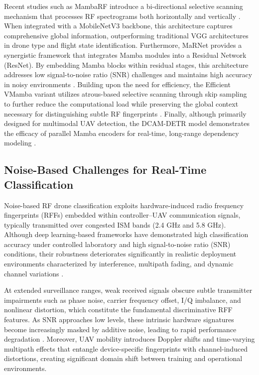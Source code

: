 \documentclass[runningheads]{llncs}
\begin{document}
Recent studies such as MambaRF introduce a bi-directional selective scanning mechanism that processes RF spectrograms both horizontally and vertically \cite{yao2025mambarf}. When integrated with a MobileNetV3 backbone, this architecture captures comprehensive global information, outperforming traditional VGG architectures in drone type and flight state identification. Furthermore, MaRNet provides a synergistic framework that integrates Mamba modules into a Residual Network (ResNet). By embedding Mamba blocks within residual stages, this architecture addresses low signal-to-noise ratio (SNR) challenges and maintains high accuracy in noisy environments \cite{mi2026marnet}. Building upon the need for efficiency, the Efficient VMamba variant utilizes atrous-based selective scanning through skip sampling to further reduce the computational load while preserving the global context necessary for distinguishing subtle RF fingerprints \cite{pei2024efficient}. Finally, although primarily designed for multimodal UAV detection, the DCAM-DETR model demonstrates the efficacy of parallel Mamba encoders for real-time, long-range dependency modeling \cite{qin2026dcam}.


\subsection{Noise-Based Challenges for Real-Time Classification}


Noise-based RF drone classification exploits hardware-induced radio frequency fingerprints (RFFs) embedded within controller–UAV communication signals, typically transmitted over congested ISM bands (2.4 GHz and 5.8 GHz). Although deep learning-based frameworks have demonstrated high classification accuracy under controlled laboratory and high signal-to-noise ratio (SNR) conditions, their robustness deteriorates significantly in realistic deployment environments characterized by interference, multipath fading, and dynamic channel variations \cite{Noh2022,Podder2025}.

At extended surveillance ranges, weak received signals obscure subtle transmitter impairments such as phase noise, carrier frequency offset, I/Q imbalance, and nonlinear distortion, which constitute the fundamental discriminative RFF features. As SNR approaches low levels, these intrinsic hardware signatures become increasingly masked by additive noise, leading to rapid performance degradation \cite{Podder2025}. Moreover, UAV mobility introduces Doppler shifts and time-varying multipath effects that entangle device-specific fingerprints with channel-induced distortions, creating significant domain shift between training and operational environments.
\end{document}
